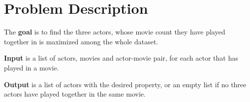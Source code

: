 \section{Problem Description}
\label{ProblemDescription}

The \textbf{goal} is to find the three actors, whose movie count they have played together in is maximized among the whole dataset.

\textbf{Input} is a list of actors, movies and actor-movie pair, for each actor that has played in a movie.

\textbf{Output} is a list of actors with the desired property, or an empty list if no three actors have played together in the same movie.

